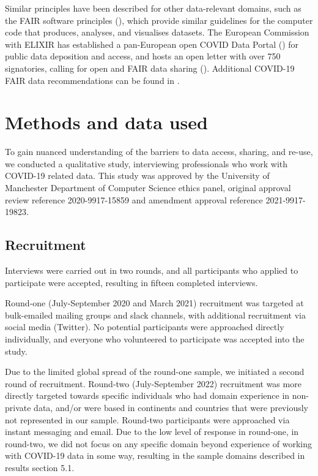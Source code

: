 \documentclass{CUP-JNL-DAP}%
\begin{document}
Similar principles have been described for other data-relevant domains, such as the FAIR software principles (\cite{chue_hong_fair_2021}), which provide similar guidelines for the computer code that produces, analyses, and visualises datasets. The European Commission with ELIXIR has established a pan-European open COVID Data Portal (\cite{elixirCovidPortal}) for public data deposition and access, and hosts an open letter with over 750 signatories, calling for open and FAIR data sharing (\cite{openDataLetter}). Additional COVID-19 FAIR data recommendations can be found in \cite{FAIR_data_for_a_coordinated_COVID-19_response}.

\section{Methods and data used}
To gain nuanced understanding of the barriers to data access, sharing, and re-use, we conducted a qualitative study, interviewing professionals who work with COVID-19 related data. This study was approved by the University of Manchester Department of Computer Science ethics panel, original approval review reference 2020-9917-15859 and amendment approval reference 2021-9917-19823. 

\subsection{Recruitment}
Interviews were carried out in two rounds, and all participants who applied to participate were accepted, resulting in fifteen completed interviews. 

Round-one (July-September 2020 and March 2021) recruitment was targeted at bulk-emailed mailing groups and slack channels, with additional recruitment via social media (Twitter). No potential participants were approached directly individually, and everyone who volunteered to participate was accepted into the study.  

Due to the limited global spread of the round-one sample, we initiated a second round of recruitment. Round-two (July-September 2022) recruitment was more directly targeted towards specific individuals who had domain experience in non-private data, and/or were based in continents and countries that were previously not represented in our sample. Round-two participants were approached via instant messaging and email. Due to the low level of response in round-one, in round-two, we did not focus on any specific domain beyond experience of working with COVID-19 data in some way, resulting in the sample domains described in results section 5.1.
\end{document}
